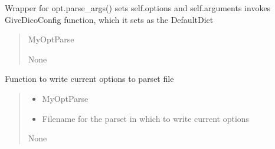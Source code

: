 \documentclass[letterpaper,10pt,english]{sphinxmanual}
\begin{document}
\begin{fulllineitems}
\begin{fulllineitems}
\label{\detokenize{api/killMS.Parset:killMS.Parset.MyOptParse.MyOptParse.ReadInput}}
\pysigstartsignatures
{}
\pysigstopsignatures
\sphinxAtStartPar
Wrapper for opt.parse\_args()
sets self.options and self.arguments
invokes GiveDicoConfig function, which it sets as the DefaultDict
\begin{quote}\begin{description}
\sphinxAtStartPar
{} \textendash{} MyOptParse

\sphinxAtStartPar
None

\end{description}\end{quote}

\end{fulllineitems}


\begin{fulllineitems}
\label{\detokenize{api/killMS.Parset:killMS.Parset.MyOptParse.MyOptParse.ToParset}}
\pysigstartsignatures
{}
\pysigstopsignatures
\sphinxAtStartPar
Function to write current options to parset file
\begin{quote}\begin{description}
\begin{itemize}
\item {} 
\sphinxAtStartPar
{} \textendash{} MyOptParse

\item {} 
\sphinxAtStartPar
{} \textendash{} Filename for the parset in which to write current options

\end{itemize}

\sphinxAtStartPar
None

\end{description}\end{quote}

\end{fulllineitems}


\end{fulllineitems}
\end{document}
